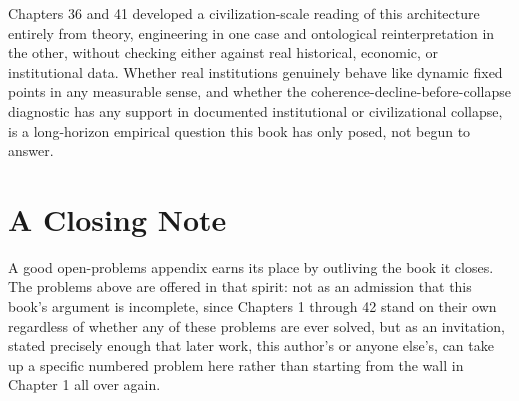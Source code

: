 Chapters 36 and 41 developed a civilization-scale reading of this architecture entirely from theory, engineering in one case and ontological reinterpretation in the other, without checking either against real historical, economic, or institutional data. Whether real institutions genuinely behave like dynamic fixed points in any measurable sense, and whether the coherence-decline-before-collapse diagnostic has any support in documented institutional or civilizational collapse, is a long-horizon empirical question this book has only posed, not begun to answer.

\section{A Closing Note}

A good open-problems appendix earns its place by outliving the book it closes. The problems above are offered in that spirit: not as an admission that this book's argument is incomplete, since Chapters 1 through 42 stand on their own regardless of whether any of these problems are ever solved, but as an invitation, stated precisely enough that later work, this author's or anyone else's, can take up a specific numbered problem here rather than starting from the wall in Chapter 1 all over again.
